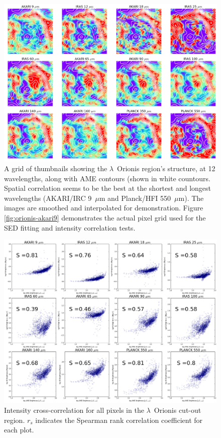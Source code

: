   \begin{figure}
    \includegraphics[width=\textwidth]{../Plots/lOrionis_grid_img.png}
    \centering
    \caption{A grid of thumbnails showing the $\lambda$~Orionis region's structure, at 12 wavelengths, along with AME contours (shown in white countours. Spatial correlation seems to be the best at the shortest and longest wavelengths (AKARI/IRC 9~$\mu$m and Planck/HFI 550~$\mu$m). The images are smoothed and interpolated for demonstration. Figure \ref{fig:orionis-akari9} demonstrates the actual pixel grid used for the SED fitting and intensity correlation tests.}
    \label{fig:orionis-img}
  \end{figure}

  \begin{figure}
    \includegraphics[width=\textwidth]{../Plots/orionis_correlations_AME.png}
    \centering
    \caption{Intensity cross-correlation for all pixels in the $\lambda$~Orionis cut-out region.  $r_{s}$ indicates the Spearman rank correlation coefficient for each plot.}
    \label{fig:orionis-corr}
  \end{figure}


